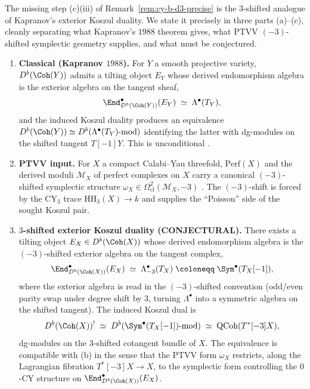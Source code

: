 \begin{conjecture}
\label{conj:kapranov-3shifted-exterior-koszul}
\ClaimStatusConjectured
The missing step (c)(iii) of Remark~\ref{rem:cy-b-d3-precise} is the
$3$-shifted analogue of Kapranov's exterior Koszul duality. We state it
precisely in three parts (a)--(c), cleanly separating what Kapranov's
$1988$ theorem gives, what PTVV $(-3)$-shifted symplectic geometry
supplies, and what must be conjectured.
\begin{enumerate}[label=\textup{(\alph*)}]
 \item \textbf{Classical (Kapranov $1988$).} For $Y$ a smooth projective
 variety, $D^b(\Coh(Y))$ admits a tilting object $E_Y$ whose derived
 endomorphism algebra is the exterior algebra on the tangent sheaf,
 \[
 \End^\bullet_{D^b(\Coh(Y))}(E_Y) \;\simeq\; \Lambda^\bullet(T_Y),
 \]
 and the induced Koszul duality produces an equivalence
 $D^b(\Coh(Y)) \simeq D^b(\Lambda^\bullet(T_Y)\text{-mod})$ identifying
 the latter with dg-modules on the shifted tangent $T[-1]Y$. This is
 unconditional \cite{Kapranov1988}.
 \item \textbf{PTVV input.} For $X$ a compact Calabi--Yau threefold,
 $\mathrm{Perf}(X)$ and the derived moduli $\mathcal{M}_X$ of perfect
 complexes on $X$ carry a canonical $(-3)$-shifted symplectic structure
 $\omega_X \in \Omega^2_{\mathrm{cl}}(\mathcal{M}_X, -3)$
 \cite{PTVV2013}. The $(-3)$-shift is forced by the CY$_3$ trace
 $\mathrm{HH}_3(X) \to k$ and supplies the ``Poisson'' side of the
 sought Koszul pair.
 \item \textbf{$3$-shifted exterior Koszul duality (CONJECTURAL).}
 There exists a tilting object $E_X \in D^b(\Coh(X))$ whose derived
 endomorphism algebra is the $(-3)$-shifted exterior algebra on the
 tangent complex,
 \[
 \End^\bullet_{D^b(\Coh(X))}(E_X) \;\simeq\;
 \Lambda^\bullet_{-3}(T_X) \;\coloneqq\; \Sym^\bullet(T_X[-1]),
 \]
 where the exterior algebra is read in the $(-3)$-shifted convention
 (odd/even parity swap under degree shift by $3$, turning
 $\Lambda^\bullet$ into a symmetric algebra on the shifted tangent).
 The induced Koszul dual is
 \[
 D^b(\Coh(X))^! \;\simeq\;
 D^b\!\left(\Sym^\bullet(T_X[-1])\text{-mod}\right)
 \;\simeq\;
 \mathrm{QCoh}(T^*[-3]X),
 \]
 dg-modules on the $3$-shifted cotangent bundle of $X$. The
 equivalence is compatible with (b) in the sense that the PTVV
 form $\omega_X$ restricts, along the Lagrangian fibration
 $T^*[-3]X \to X$, to the symplectic form controlling the $0$-CY
 structure on $\End^\bullet_{D^b(\Coh(X))}(E_X)$.

\end{enumerate}
\end{conjecture}
